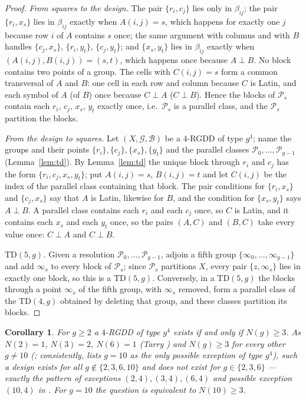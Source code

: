 \documentclass[11pt]{article}
\newtheorem{corollary}[theorem]{Corollary}
\theoremstyle{remark}
\newcommand{\TD}{\mathrm{TD}}
\begin{document}
\begin{proof}
\emph{From squares to the design.}  The pair $\{r_i,c_j\}$ lies only in $\beta_{ij}$;
the pair $\{r_i,x_s\}$ lies in $\beta_{ij}$ exactly when $A(i,j)=s$, which happens for
exactly one $j$ because row $i$ of $A$ contains $s$ once; the same argument with
columns and with $B$ handles $\{c_j,x_s\}$, $\{r_i,y_t\}$, $\{c_j,y_t\}$; and
$\{x_s,y_t\}$ lies in $\beta_{ij}$ exactly when $(A(i,j),B(i,j))=(s,t)$, which happens
once because $A\perp B$.  No block contains two points of a group.  The cells with
$C(i,j)=s$ form a common transversal of $A$ and $B$: one cell in each row and column
because $C$ is Latin, and each symbol of $A$ (of $B$) once because $C\perp A$
($C\perp B$).  Hence the blocks of $\mathcal P_s$ contain each $r_i$, $c_j$, $x_s$, $y_t$
exactly once, i.e.\ $\mathcal P_s$ is a parallel class, and the $\mathcal P_s$ partition
the blocks.

\emph{From the design to squares.}  Let $(X,\mathcal G,\mathcal B)$ be a $4$-RGDD of type
$g^{4}$; name the groups and their points $\{r_i\},\{c_j\},\{x_s\},\{y_t\}$ and the
parallel classes $\mathcal P_0,\dots,\mathcal P_{g-1}$ (Lemma~\ref{lem:td}).  By
Lemma~\ref{lem:td} the unique block through $r_i$ and $c_j$ has the form
$\{r_i,c_j,x_s,y_t\}$; put $A(i,j)=s$, $B(i,j)=t$ and let $C(i,j)$ be the index of the
parallel class containing that block.  The pair conditions for $\{r_i,x_s\}$ and
$\{c_j,x_s\}$ say that $A$ is Latin, likewise for $B$, and the condition for
$\{x_s,y_t\}$ says $A\perp B$.  A parallel class contains each $r_i$ and each $c_j$
once, so $C$ is Latin, and it contains each $x_s$ and each $y_t$ once, so the pairs
$(A,C)$ and $(B,C)$ take every value once: $C\perp A$ and $C\perp B$.

\emph{$\TD(5,g)$.}  Given a resolution $\mathcal P_0,\dots,\mathcal P_{g-1}$, adjoin a fifth
group $\{\infty_0,\dots,\infty_{g-1}\}$ and add $\infty_s$ to every block of $\mathcal P_s$;
since $\mathcal P_s$ partitions $X$, every pair $\{z,\infty_s\}$ lies in exactly one block,
so this is a $\TD(5,g)$.  Conversely, in a $\TD(5,g)$ the blocks through a point $\infty_s$
of the fifth group, with $\infty_s$ removed, form a parallel class of the $\TD(4,g)$ obtained
by deleting that group, and these classes partition its blocks.
\end{proof}

\begin{corollary}\label{cor:types}
For $g\ge 2$ a $4$-RGDD of type $g^{4}$ exists if and only if $N(g)\ge 3$.  As $N(2)=1$,
$N(3)=2$, $N(6)=1$ (Tarry \cite{Tar1900}) and $N(g)\ge 3$ for every other $g\ne 10$
(\cite{ACD07}; consistently, \cite[Theorem~5.2]{WG17} lists $g=10$ as the only possible
exception of type $g^{4}$), such a design exists
for all $g\notin\{2,3,6,10\}$ and does not exist for
$g\in\{2,3,6\}$ --- exactly the pattern of exceptions $(2,4),(3,4),(6,4)$ and possible
exception $(10,4)$ in \cite{WG14,WG17}.  For $g=10$ the question is equivalent to $N(10)\ge 3$.
\end{corollary}
\end{document}
